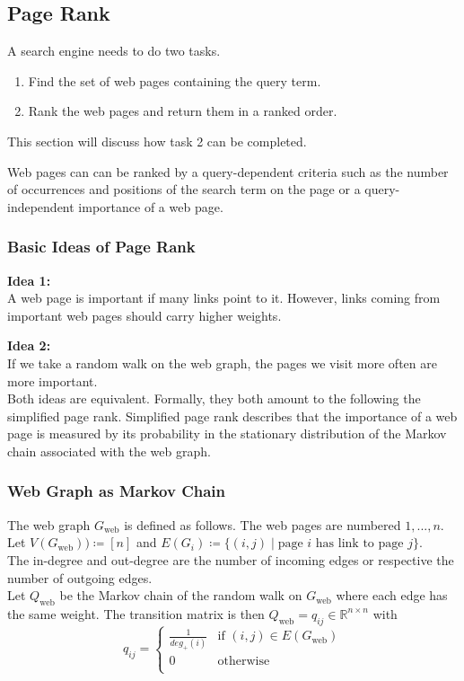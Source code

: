 \documentclass[english]{panikzettel}
\begin{document}
\subsection{Page Rank}
\label{afods:pagerank}
A search engine needs to do two tasks.
\begin{enumerate}
\item Find the set of web pages containing the query term.
\item Rank the web pages and return them in a ranked order.
\end{enumerate}
This section will discuss how task 2 can be completed.

Web pages can can be ranked by a query-dependent criteria such as the number of occurrences and positions of the search term on the page or a query-independent importance of a web page.

\subsubsection{Basic Ideas of Page Rank}
\textbf{Idea 1:}\\
A web page is important if many links point to it. However, links coming from important web pages should carry higher weights.

\textbf{Idea 2:}\\
If we take a random walk on the web graph, the pages we visit more often are more important.\\

Both ideas are equivalent. Formally, they both amount to the following the simplified page rank. Simplified page rank describes that the importance of a web page is measured by its probability in the stationary distribution of the Markov chain associated with the web graph.

\subsubsection{Web Graph as Markov Chain}
The web graph $G_{\text{web}}$ is defined as follows. The web pages are numbered $1,...,n$. Let $V(G_{\text{web}}))\coloneqq [n]$ and $E(G_i)\coloneqq \{(i,j) \mid \text{page } i \text{ has link to page } j\}$.\\
The in-degree and out-degree are the number of incoming edges or respective the number of outgoing edges.\\
Let $Q_{\text{web}}$ be the Markov chain of the random walk on $G_{\text{web}}$ where each edge has the same weight. The transition matrix is then $Q_{\text{web}}=q_{ij}\in\mathbb{R}^{n\times n}$  with
\[
q_{ij}=
\begin{cases}
\frac{1}{deg_{+}(i)} & \text{if }(i,j)\in E(G_{\text{web}})  \\
0 & \text{otherwise} \\
\end{cases}
\]
\end{document}
